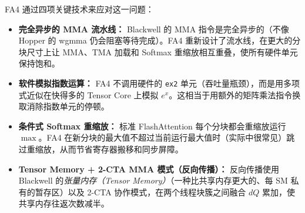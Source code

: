 FA4 通过四项关键技术来应对这一问题：

\begin{itemize}
  \item \textbf{完全异步的 MMA 流水线：} Blackwell 的 MMA 指令是完全异步的（不像 Hopper 的 wgmma 仍会阻塞等待完成）。FA4 重新设计了流水线，在更大的分块尺寸上让 MMA、TMA 加载和 Softmax 重缩放相互重叠，使所有硬件单元保持饱和。
  \item \textbf{软件模拟指数运算：} FA4 不调用硬件的 \texttt{ex2} 单元（吞吐量瓶颈），而是用多项式近似在快得多的 Tensor Core 上模拟 $e^x$。这相当于用额外的矩阵乘法指令换取消除指数单元的停顿。
  \item \textbf{条件式 Softmax 重缩放：} 标准 FlashAttention 每个分块都会重缩放运行 $\max$。FA4 在新分块的最大值不超过当前运行最大值时（实际中很常见）跳过重缩放，从而节省寄存器搬移和同步屏障。
  \item \textbf{Tensor Memory + 2-CTA MMA 模式（反向传播）：} 反向传播使用 Blackwell 的\emph{张量内存（Tensor Memory）}（一种比共享内存更大的、每 SM 私有的暂存区）以及 2-CTA 协作模式，在两个线程块簇之间融合 $dQ$ 累加，使共享内存往返次数减半。
\end{itemize}

